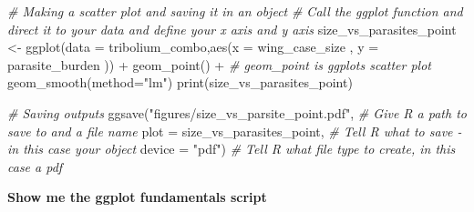 \documentclass[
]{book}
\newenvironment{Shaded}{\begin{snugshade}}{\end{snugshade}}
\newcommand{\AttributeTok}[1]{\textcolor[rgb]{0.77,0.63,0.00}{#1}}
\newcommand{\CommentTok}[1]{\textcolor[rgb]{0.56,0.35,0.01}{\textit{#1}}}
\newcommand{\FunctionTok}[1]{\textcolor[rgb]{0.00,0.00,0.00}{#1}}
\newcommand{\NormalTok}[1]{#1}
\newcommand{\OtherTok}[1]{\textcolor[rgb]{0.56,0.35,0.01}{#1}}
\newcommand{\SpecialCharTok}[1]{\textcolor[rgb]{0.00,0.00,0.00}{#1}}
\newcommand{\StringTok}[1]{\textcolor[rgb]{0.31,0.60,0.02}{#1}}
\begin{document}
\begin{Shaded}
\begin{Highlighting}[]
\CommentTok{\# Making a scatter plot and saving it in an object}
\CommentTok{\# Call the ggplot function and direct it to your data and define your x axis and y axis}
\NormalTok{size\_vs\_parasites\_point }\OtherTok{\textless{}{-}} \FunctionTok{ggplot}\NormalTok{(}\AttributeTok{data =}\NormalTok{ tribolium\_combo,}\FunctionTok{aes}\NormalTok{(}\AttributeTok{x =}\NormalTok{ wing\_case\_size , }\AttributeTok{y =}\NormalTok{ parasite\_burden )) }\SpecialCharTok{+} 
  \FunctionTok{geom\_point}\NormalTok{() }\SpecialCharTok{+} \CommentTok{\# geom\_point is ggplots scatter plot}
  \FunctionTok{geom\_smooth}\NormalTok{(}\AttributeTok{method=}\StringTok{"lm"}\NormalTok{)}
\FunctionTok{print}\NormalTok{(size\_vs\_parasites\_point)}

\CommentTok{\# Saving outputs}
\FunctionTok{ggsave}\NormalTok{(}\StringTok{"figures/size\_vs\_parsite\_point.pdf"}\NormalTok{, }\CommentTok{\# Give R a path to save to and a file name}
       \AttributeTok{plot =}\NormalTok{ size\_vs\_parasites\_point, }\CommentTok{\# Tell R what to save {-} in this case your object}
       \AttributeTok{device =} \StringTok{"pdf"}\NormalTok{) }\CommentTok{\# Tell R what file type to create, in this case a pdf}
\end{Highlighting}
\end{Shaded}

\textbf{Show me the ggplot fundamentals script}
\end{document}
